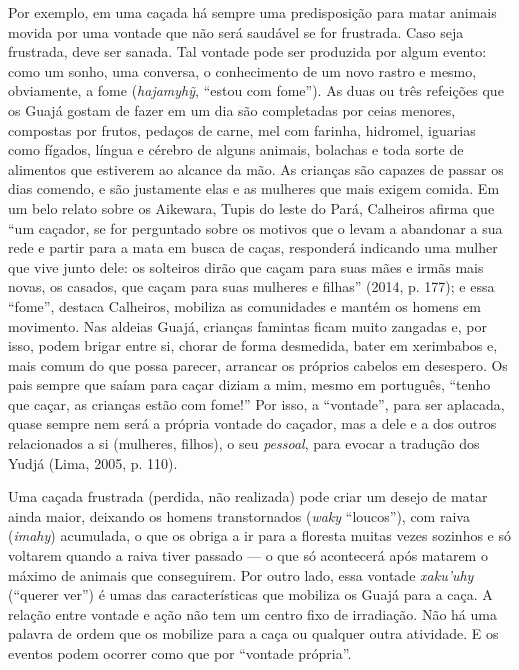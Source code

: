 Por exemplo, em uma caçada há sempre uma predisposição para matar
animais movida por uma vontade que não será saudável se for frustrada.
Caso seja frustrada, deve ser sanada. Tal vontade pode ser produzida por
algum evento: como um sonho, uma conversa, o conhecimento de um novo
rastro e mesmo, obviamente, a fome (\emph{hajamyhỹ}, ``estou com
fome''). As duas ou três refeições que os Guajá gostam de fazer em um
dia são completadas por ceias menores, compostas por frutos, pedaços de
carne, mel com farinha, hidromel, iguarias como fígados, língua e
cérebro de alguns animais, bolachas e toda sorte de alimentos que
estiverem ao alcance da mão. As crianças são capazes de passar os dias
comendo, e são justamente elas e as mulheres que mais exigem comida. Em
um belo relato sobre os Aikewara, Tupis do leste do Pará, Calheiros
afirma que ``um caçador, se for perguntado sobre os motivos que o levam
a abandonar a sua rede e partir para a mata em busca de caças,
responderá indicando uma mulher que vive junto dele: os solteiros dirão
que caçam para suas mães e irmãs mais novas, os casados, que caçam para
suas mulheres e filhas'' (2014, p. 177); e essa ``fome'', destaca
Calheiros, mobiliza as comunidades e mantém os homens em movimento. Nas
aldeias Guajá, crianças famintas ficam muito zangadas e, por isso, podem
brigar entre si, chorar de forma desmedida, bater em xerimbabos e, mais
comum do que possa parecer, arrancar os próprios cabelos em desespero.
Os pais sempre que saíam para caçar diziam a mim, mesmo em português,
``tenho que caçar, as crianças estão com fome!'' Por isso, a
``vontade'', para ser aplacada, quase sempre nem será a própria vontade
do caçador, mas a dele e a dos outros relacionados a si (mulheres,
filhos), o seu \emph{pessoal}, para evocar a tradução dos Yudjá (Lima,
2005, p. 110).

Uma caçada frustrada (perdida, não realizada) pode criar um desejo de
matar ainda maior, deixando os homens transtornados (\emph{waky}
``loucos''), com raiva (\emph{imahy}) acumulada, o que os obriga a ir para
a floresta muitas vezes sozinhos e só voltarem quando a raiva tiver
passado --- o que só acontecerá após matarem o máximo de animais que
conseguirem. Por outro lado, essa vontade \emph{xaku'uhy} (``querer ver'')
é umas das características que mobiliza os Guajá para a caça. A relação
entre vontade e ação não tem um centro fixo de irradiação. Não há uma
palavra de ordem que os mobilize para a caça ou qualquer outra
atividade. E os eventos podem ocorrer como que por ``vontade própria''.

